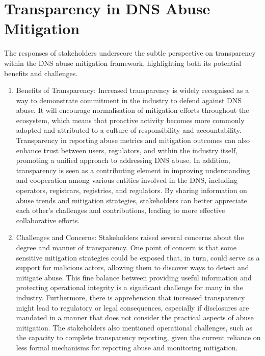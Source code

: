\section{Transparency in DNS Abuse Mitigation} 

The responses of stakeholders underscore the subtle perspective on transparency within the DNS abuse mitigation framework, highlighting both its potential benefits and challenges.

\begin{enumerate}
    \item Benefits of Transparency: Increased transparency is widely recognised as a way to demonstrate commitment in the industry to defend against DNS abuse. It will encourage normalisation of mitigation efforts throughout the ecosystem, which means that proactive activity becomes more commonly adopted and attributed to a culture of responsibility and accountability. Transparency in reporting abuse metrics and mitigation outcomes can also enhance trust between users, regulators, and within the industry itself, promoting a unified approach to addressing DNS abuse. In addition, transparency is seen as a contributing element in improving understanding and cooperation among various entities involved in the DNS, including operators, registrars, registries, and regulators. By sharing information on abuse trends and mitigation strategies, stakeholders can better appreciate each other's challenges and contributions, leading to more effective collaborative efforts.

    \item Challenges and Concerns: Stakeholders raised several concerns about the degree and manner of transparency. One point of concern is that some sensitive mitigation strategies could be exposed that, in turn, could serve as a support for malicious actors, allowing them to discover ways to detect and mitigate abuse. This fine balance between providing useful information and protecting operational integrity is a significant challenge for many in the industry. Furthermore, there is apprehension that increased transparency might lead to regulatory or legal consequences, especially if disclosures are mandated in a manner that does not consider the practical aspects of abuse mitigation. The stakeholders also mentioned operational challenges, such as the capacity to complete transparency reporting, given the current reliance on less formal mechanisms for reporting abuse and monitoring mitigation.
    

\end{enumerate}
